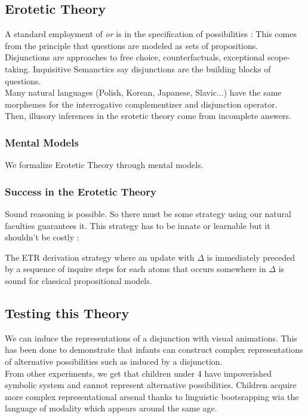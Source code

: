 \documentclass{cours}
\begin{document}
\subsection{Erotetic Theory}
A standard employment of \textsl{or} is in the specification of possibilities : This comes from the principle that questions are modeled as sets of propositions. \\ Disjunctions are approaches to free choice, counterfactuals, exceptional scope-taking. Inquisitive Semanctics say disjunctions are the building blocks of questions. \\
Many natural languages (Polish, Korean, Japanese, Slavic...) have the same morphemes for the interrogative complementizer and disjunction operator.\\

Then, illusory inferences in the erotetic theory come from incomplete answers. 

\subsubsection{Mental Models}
We formalize Erotetic Theory through mental models. %

\subsubsection{Success in the Erotetic Theory}
Sound reasoning is possible. So there must be some strategy using our natural faculties guarantees it. This strategy has to be innate or learnable but it shouldn't be costly : 
\begin{theorem}
    The ETR derivation strategy where an update with $\Delta$ is immediately preceded by a sequence of inquire steps for each atoms that occurs somewhere in $\Delta$ is sound for classical propositional models. 
\end{theorem}

\subsection{Testing this Theory}
We can induce the representations of a disjunction with visual animations. This has been done to demonstrate that infants can construct complex representations of alternative possibilities such as induced by a disjunction. \\
From other experiments, we get that children under 4 have impoverished symbolic system and cannot represent alternative possibilities. Children acquire more complex representational arsenal thanks to linguistic bootsrapping wia the language of modality which appears around the same age. 
\end{document}
